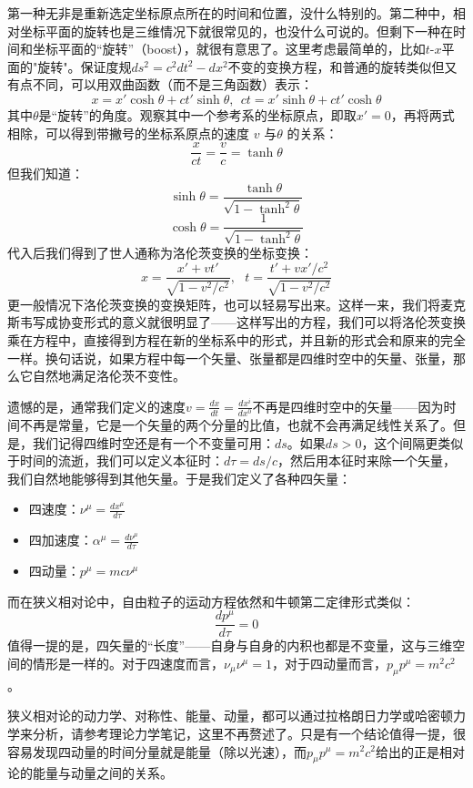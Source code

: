 \documentclass{ctexart}
\begin{document}
第一种无非是重新选定坐标原点所在的时间和位置，没什么特别的。第二种中，相对坐标平面的旋转也是三维情况下就很常见的，也没什么可说的。但剩下一种在时间和坐标平面的“旋转”（boost），就很有意思了。这里考虑最简单的，比如$t$-$x$平面的"旋转"。保证度规$ds^2=c^2dt^2-dx^2$不变的变换方程，和普通的旋转类似但又有点不同，可以用双曲函数（而不是三角函数）表示：
\begin{equation}
x=x'\cosh\theta+ct'\sinh\theta,\ \ ct=x'\sinh\theta+ct'\cosh\theta
\end{equation}
其中$\theta$是“旋转”的角度。观察其中一个参考系的坐标原点，即取$x'=0$，再将两式相除，可以得到带撇号的坐标系原点的速度 $v$ 与$\theta$ 的关系：
\begin{equation}
\frac{x}{ct}=\frac{v}{c}=\tanh\theta
\end{equation}
但我们知道：
\begin{equation}
\sinh\theta=\frac{\tanh\theta}{\sqrt{1-\tanh^2\theta}}
\end{equation}
\begin{equation}
\cosh\theta=\frac{1}{\sqrt{1-\tanh^2\theta}}
\end{equation}
代入后我们得到了世人通称为洛伦茨变换的坐标变换：
\begin{equation}
x=\frac{x'+vt'}{\sqrt{1-v^2/c^2}},\ \ \ t=\frac{t'+vx'/c^2}{\sqrt{1-v^2/c^2}}
\end{equation}
更一般情况下洛伦茨变换的变换矩阵，也可以轻易写出来。这样一来，我们将麦克斯韦写成协变形式的意义就很明显了——这样写出的方程，我们可以将洛伦茨变换乘在方程中，直接得到方程在新的坐标系中的形式，并且新的形式会和原来的完全一样。换句话说，如果方程中每一个矢量、张量都是四维时空中的矢量、张量，那么它自然地满足洛伦茨不变性。

遗憾的是，通常我们定义的速度$v=\frac{dx}{dt}=\frac{dx^i}{dx^0}$不再是四维时空中的矢量——因为时间不再是常量，它是一个矢量的两个分量的比值，也就不会再满足线性关系了。但是，我们记得四维时空还是有一个不变量可用：$ds$。如果$ds>0$，这个间隔更类似于时间的流逝，我们可以定义本征时：$d\tau=ds/c$，然后用本征时来除一个矢量，我们自然地能够得到其他矢量。于是我们定义了各种四矢量：
\begin{itemize}
\item 四速度：$\nu^\mu=\frac{dx^\mu}{d\tau}$
\item 四加速度：$\alpha^\mu=\frac{d\nu^\mu}{d\tau}$
\item 四动量：$p^\mu=mc\nu^\mu$
\end{itemize}
而在狭义相对论中，自由粒子的运动方程依然和牛顿第二定律形式类似：
\begin{equation}
\frac{dp^\mu}{d\tau}=0
\end{equation}
值得一提的是，四矢量的“长度”——自身与自身的内积也都是不变量，这与三维空间的情形是一样的。对于四速度而言，$\nu_\mu\nu^\mu=1$，对于四动量而言，$p_\mu p^\mu=m^2c^2$。

狭义相对论的动力学、对称性、能量、动量，都可以通过拉格朗日力学或哈密顿力学来分析，请参考理论力学笔记，这里不再赘述了。只是有一个结论值得一提，很容易发现四动量的时间分量就是能量（除以光速），而$p_\mu p^\mu=m^2c^2$给出的正是相对论的能量与动量之间的关系。
\end{document}
